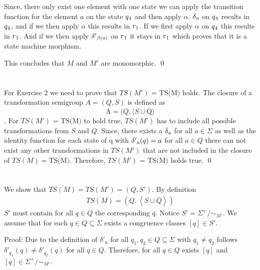 \documentclass[a4paper,12pt,numbers=noenddot]{scrreport}
\def\lsk{\left<}
\def\rsk{\right>}
\begin{document}
Since, there only exist one element with one state we can apply the transition function for the element $a$ on the state $q\textsubscript{4}$ and then apply $\alpha$. $\delta\textsubscript{a}$ on $q\textsubscript{4}$ results in $q\textsubscript{4}$, and if we then apply $\alpha$ this results in $r\textsubscript{1}$. If we first apply $\alpha$ on $q\textsubscript{4}$ this results in $r\textsubscript{1}$. And if we then apply $\delta'\textsubscript{$\beta(a)$}$ on $r\textsubscript{1}$ it stays in $r\textsubscript{1}$ which proves that it is a state machine morphism. 

This concludes that $M$ and $M'$ are monomorphic.
\qed

\section{}

For Exercise 2 we need to prove that $TS(M')$ = $\overline{\mbox{TS(M)}}$ holds. The closure of a transformation semigroup $A = (Q, S)$ is defined as 
\begin{equation}
    \overline{\mbox{A}} = (Q, \langle S \cup \overline{\mbox{Q}} \rangle
\end{equation}
.
For $TS(M')$ = $\overline{\mbox{TS(M)}}$ to hold true, $TS(M')$ has to include all possible transformations from $S$ and $Q$. Since, there exists a $\delta\textsubscript{a}$ for all $a \in \Sigma$ as well as the identity function for each state of q with $\delta'\textsubscript{a}(q) = a$ for all $a \in Q$ there can not exist any other transformations in $TS(M')$ that are not included in the closure of $TS(M) = \overline{\mbox{TS(M)}}$. Therefore, $TS(M')$ = $\overline{\mbox{TS(M)}}$ holds true.
\qed

\section{}
We show that $\overline{TS(M)}=TS(M')=(Q,S')$. By definition
\begin{align*}
    \overline{TS(M)}=(Q,\lsk S \cup \overline{Q} \rsk)
\end{align*}
$S'$ must contain for all $q \in Q$ the corresponding $\overline{q}$.
Notice $S'= \Sigma^+/\sim_{M'}$.
We assume that for each $q \in Q \subseteq \Sigma$ exists a congruence classes $[q] \in S'$.

Proof:
Due to the definition of $\delta'_a$ for all $q_1,q_2 \in Q \subseteq \Sigma$ with $q_1 \neq q_2$ follows $\delta'_{q_1}(q) \neq \delta'_{q_2}(q)$ for all $q \in Q$.
Therefore, for all $q \in Q$ exists $[q]$ and $[q] \in \Sigma^+/\sim_{M'}$.
\end{document}
